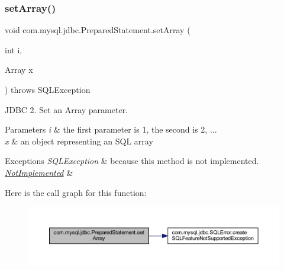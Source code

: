 \subsubsection{\texorpdfstring{set\+Array()}{setArray()}}
{\footnotesize\ttfamily void com.\+mysql.\+jdbc.\+Prepared\+Statement.\+set\+Array (\begin{DoxyParamCaption}\item[{int}]{i,  }\item[{Array}]{x }\end{DoxyParamCaption}) throws S\+Q\+L\+Exception}

J\+D\+BC 2. Set an Array parameter.


\begin{DoxyParams}{Parameters}
{\em i} & the first parameter is 1, the second is 2, ... \\
\hline
{\em x} & an object representing an S\+QL array\\
\hline
\end{DoxyParams}

\begin{DoxyExceptions}{Exceptions}
{\em S\+Q\+L\+Exception} & because this method is not implemented. \\
\hline
{\em \mbox{\hyperlink{classcom_1_1mysql_1_1jdbc_1_1_not_implemented}{Not\+Implemented}}} & \\
\hline
\end{DoxyExceptions}
Here is the call graph for this function\+:
\nopagebreak
\begin{figure}[H]
\begin{center}
\leavevmode
\includegraphics[width=350pt]{classcom_1_1mysql_1_1jdbc_1_1_prepared_statement_a435eccbc94fa43a060e987fa8236fbe8_cgraph}
\end{center}
\end{figure}
\mbox{\label{classcom_1_1mysql_1_1jdbc_1_1_prepared_statement_ae3612d6b5fc893fa6e24ec026c40a100}} 

